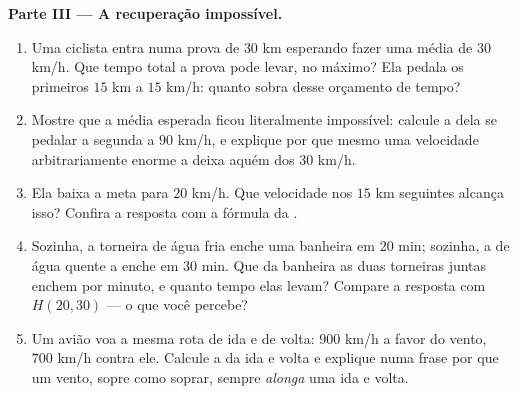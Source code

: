 \begin{problem}
\medskip
\noindent\textbf{Parte III --- A recuperação impossível.}
\begin{enumerate}[resume]
  \item Uma ciclista entra numa prova de $30$ km esperando fazer uma
        média de $30$ km/h. Que tempo total a prova pode levar, no
        máximo? Ela pedala os primeiros $15$ km a $15$ km/h: quanto
        sobra desse orçamento de tempo?
  \item Mostre que a média esperada ficou literalmente impossível:
        calcule a  dela se pedalar a segunda  a
        $90$ km/h, e explique por que mesmo uma velocidade
        arbitrariamente enorme a deixa aquém dos $30$ km/h.
  \item Ela baixa a meta para $20$ km/h. Que velocidade nos $15$ km
        seguintes alcança isso? Confira a resposta com a fórmula da
        .
  \item Sozinha, a torneira de água fria enche uma banheira em $20$
        min; sozinha, a de água quente a enche em $30$ min. Que 
        da banheira as duas torneiras juntas enchem por minuto, e
        quanto tempo elas levam? Compare a resposta com $H(20, 30)$ ---
        o que você percebe?
  \item Um avião voa a mesma rota de ida e de volta: $900$ km/h a favor
        do vento, $700$ km/h contra ele. Calcule a  da
        ida e volta e explique numa frase por que um vento, sopre como
        soprar, sempre \emph{alonga} uma ida e volta.
\end{enumerate}
\end{problem}
